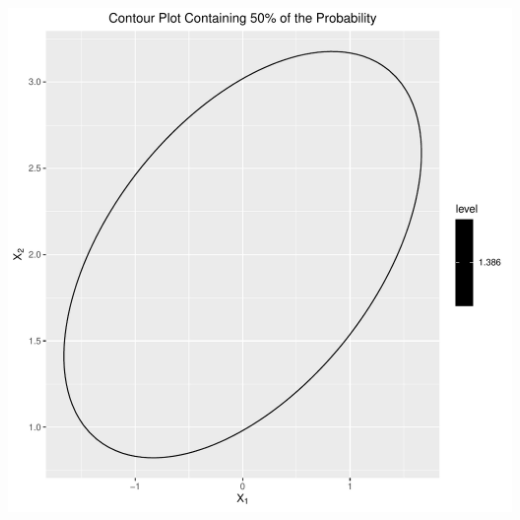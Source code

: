 \documentclass[12pt]{article}\usepackage[]{graphicx}\usepackage[]{color}
\makeatletter
\def\maxwidth{ %
  \ifdim\Gin@nat@width>\linewidth
    \linewidth
  \else
    \Gin@nat@width
  \fi
}
\newenvironment{knitrout}{}{} %
\newenvironment{problem}[2][Problem]{\begin{trivlist}
\item[\hskip \labelsep {\bfseries #1}\hskip \labelsep {\bfseries #2.}]}{\end{trivlist}}
\makeatother
\begin{document}
\begin{enumerate}[a)]
\begin{knitrout}
\color{fgcolor}
\includegraphics[width=\maxwidth]{figure/unnamed-chunk-2-1} 

\end{knitrout}
\end{enumerate}

\begin{problem}{4.3}
\end{problem}
\end{document}
